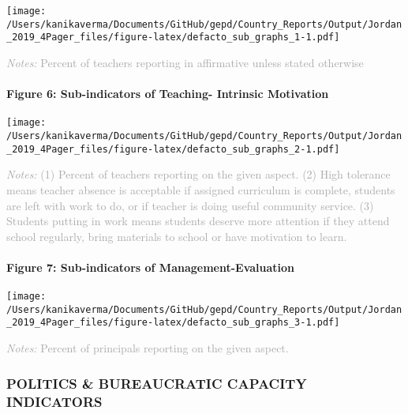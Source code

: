\documentclass[twocolumn]{article}
\let\oldparagraph\paragraph
\renewcommand{\paragraph}[1]{\oldparagraph{#1}\mbox{}}
\begin{document}
\texttt{[image: /Users/kanikaverma/Documents/GitHub/gepd/Country\_Reports/Output/Jordan\_2019\_4Pager\_files/figure-latex/defacto\_sub\_graphs\_1-1.pdf]}

{\scriptsize
    \textcolor{darkgray}{\textit{Notes:} Percent of teachers reporting in affirmative unless stated otherwise}
  }

\hypertarget{figure-6-sub-indicators-of-teaching--intrinsic-motivation}{%
\paragraph{Figure 6: Sub-indicators of Teaching- Intrinsic
Motivation}\label{figure-6-sub-indicators-of-teaching--intrinsic-motivation}}

\texttt{[image: /Users/kanikaverma/Documents/GitHub/gepd/Country\_Reports/Output/Jordan\_2019\_4Pager\_files/figure-latex/defacto\_sub\_graphs\_2-1.pdf]}

{\scriptsize
    \textcolor{darkgray}{\textit{Notes:} (1) Percent of teachers reporting on the given aspect. (2) High tolerance means teacher absence is acceptable if assigned curriculum is complete, students are left with work to do, or if teacher is doing useful community service. (3) Students putting in work means students deserve more attention if they attend school regularly, bring materials to school or have motivation to learn.}
  }

\hypertarget{figure-7-sub-indicators-of-management-evaluation}{%
\paragraph{Figure 7: Sub-indicators of
Management-Evaluation}\label{figure-7-sub-indicators-of-management-evaluation}}

\texttt{[image: /Users/kanikaverma/Documents/GitHub/gepd/Country\_Reports/Output/Jordan\_2019\_4Pager\_files/figure-latex/defacto\_sub\_graphs\_3-1.pdf]}

{\scriptsize
    \textcolor{darkgray}{\textit{Notes:} Percent of principals reporting on the given aspect.}
  }

\vfill\null

\hypertarget{politics-bureaucratic-capacity-indicators}{%
\subsubsection{\texorpdfstring{\textbf{POLITICS \& BUREAUCRATIC CAPACITY
INDICATORS}}{POLITICS \& BUREAUCRATIC CAPACITY INDICATORS}}\label{politics-bureaucratic-capacity-indicators}}
\end{document}
